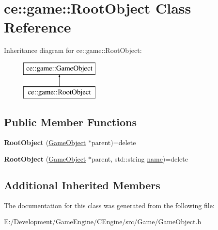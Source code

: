 \hypertarget{classce_1_1game_1_1_root_object}{}\section{ce\+:\+:game\+:\+:Root\+Object Class Reference}
\label{classce_1_1game_1_1_root_object}
Inheritance diagram for ce\+:\+:game\+:\+:Root\+Object\+:\begin{figure}[H]
\begin{center}
\leavevmode
\includegraphics[height=2.000000cm]{classce_1_1game_1_1_root_object}
\end{center}
\end{figure}
\subsection*{Public Member Functions}
\begin{DoxyCompactItemize}
\item 
\mbox{\label{classce_1_1game_1_1_root_object_a96e602fe5a016951e643fb06c7a662ce}} 
{\bfseries Root\+Object} (\hyperlink{classce_1_1game_1_1_game_object}{Game\+Object} $\ast$parent)=delete
\item 
\mbox{\label{classce_1_1game_1_1_root_object_a20e4b6d2b4e0c10fcf8d5141ccb28dfb}} 
{\bfseries Root\+Object} (\hyperlink{classce_1_1game_1_1_game_object}{Game\+Object} $\ast$parent, std\+::string \hyperlink{classce_1_1game_1_1_game_object_a1de1f674c70df3bbba6aefb938ad8f32}{name})=delete
\end{DoxyCompactItemize}
\subsection*{Additional Inherited Members}


The documentation for this class was generated from the following file\+:\begin{DoxyCompactItemize}
\item 
E\+:/\+Development/\+Game\+Engine/\+C\+Engine/src/\+Game/Game\+Object.\+h\end{DoxyCompactItemize}
